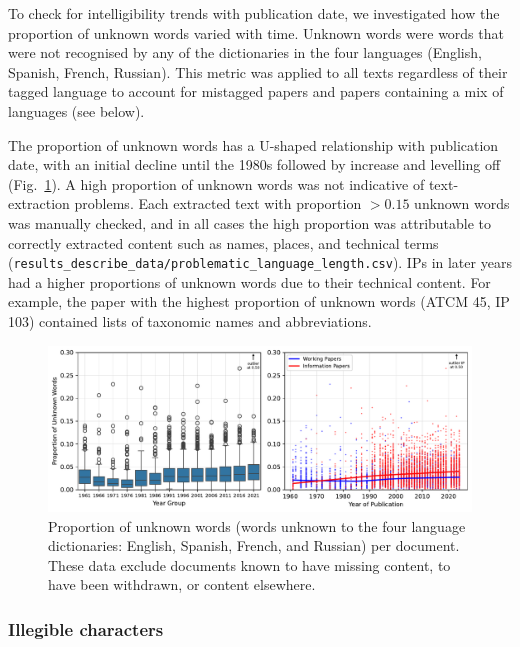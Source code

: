 \documentclass[12pt]{article}
\begin{document}
To check for intelligibility trends with publication date,
we investigated how the proportion of unknown words 
varied with time. 
Unknown words were words that were not recognised by any of the 
dictionaries in the four languages (English, Spanish, French, Russian).
This metric was applied to all texts regardless of their
tagged language to account for mistagged papers and papers
containing a mix of languages (see below).

The proportion of unknown words 
has a U-shaped relationship with publication date,
with an initial decline until the 1980s followed by increase and levelling off
(Fig.~\ref{propn_unknown_words_v_year_two_panel_annotate}).
A high proportion of unknown words was not indicative of text-extraction problems.
Each extracted text with proportion $> 0.15$ unknown words was manually checked,
and in all cases the high proportion was attributable to correctly
extracted content such as names, places, and technical terms
({\tt results\_describe\_data/problematic\_language\_length.csv}).
IPs in later years had a higher proportions of unknown words
due to their technical content.
For example,
the paper with the highest proportion of unknown words
(ATCM 45, IP 103) contained lists of taxonomic names 
and abbreviations.

\begin{figure}[h]
    \includegraphics[width=\textwidth]{../results_describe_data/propn_unknown_words_v_year_two_panel_annotate.pdf}
    \caption{
        Proportion of unknown words
        (words unknown to the four language dictionaries:
        English, Spanish, French, and Russian)
        per document.
        These data exclude documents known to have missing content,
        to have been withdrawn, or content elsewhere.
    } \label{propn_unknown_words_v_year_two_panel_annotate}
\end{figure}

\subsubsection{Illegible characters}
\end{document}
